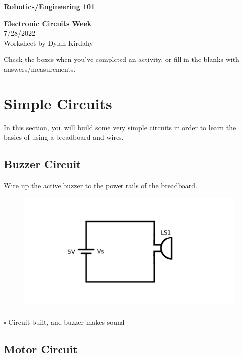 \documentclass{article}
\begin{document}
\begin{center}
        \textbf{Robotics/Engineering 101}
        
        \vspace*{12pt}

        \textbf{Electronic Circuits Week} \\
        7/28/2022 \\
        \vspace*{12pt}
        Worksheet by Dylan Kirdahy 
\end{center}


Check the boxes when you've completed an activity, or fill in the blanks with answers/measurements.

\section{Simple Circuits}

\paragraph{}
In this section, you will build some very simple circuits in order to learn the basics of using a breadboard and wires.

\subsection{Buzzer Circuit}
\paragraph{}
Wire up the active buzzer to the power rails of the breadboard.
\begin{figure}[H]
  \centering
  \includegraphics[width=0.4\linewidth]{pngs/01-buzzer.png}
\end{figure}
\paragraph{}
$\square$ Circuit built, and buzzer makes sound

\subsection{Motor Circuit}
\end{document}
